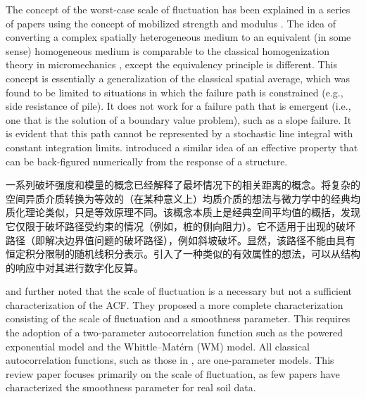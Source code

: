 \begin{ParaColumn}
    \CrossColumnText{
        
    }

    \switchcolumn*

    The concept of the worst-case scale of fluctuation has been explained in a series of papers using the concept of mobilized strength and modulus \citep{Ching2013a,Ching2013b,Ching2014686,Hu2015121,Ching2016a,Ching2016b,Ching2016e,Ching2017b,Ching2017c}. The idea of converting a complex spatially heterogeneous medium to an equivalent (in some sense) homogeneous medium is comparable to the classical homogenization theory in micromechanics \citep{Paiboon20133233}, except the equivalency principle is different. This concept is essentially a generalization of the classical spatial average, which was found to be limited to situations in which the failure path is constrained (e.g., side resistance of pile). It does not work for a failure path that is emergent (i.e., one that is the solution of a boundary value problem), such as a slope failure. It is evident that this path cannot be represented by a stochastic line integral with constant integration limits. \citet{Hicks201236,Hicks2012215,Hicks2019313} introduced a similar idea of an effective property that can be back-figured numerically from the response of a structure.

    \switchcolumn

    一系列破坏强度和模量的概念已经解释了最坏情况下的相关距离的概念\citep{Ching2013a,Ching2013b,Ching2014686,Hu2015121,Ching2016a,Ching2016b,Ching2016e,Ching2017b,Ching2017c}。将复杂的空间异质介质转换为等效的（在某种意义上）均质介质的想法与微力学中的经典均质化理论\citep{Paiboon20133233}类似，只是等效原理不同。该概念本质上是经典空间平均值的概括，发现它仅限于破坏路径受约束的情况（例如，桩的侧向阻力）。它不适用于出现的破坏路径（即解决边界值问题的破坏路径），例如斜坡破坏。显然，该路径不能由具有恒定积分限制的随机线积分表示。\citet{Hicks201236,Hicks2012215,Hicks2019313}引入了一种类似的有效属性的想法，可以从结构的响应中对其进行数字化反算。

    \switchcolumn*

    \citet{Ching2018}and \citet{Ching201981} further noted that the scale of fluctuation is a necessary but not a sufficient characterization of the ACF. They proposed a more complete characterization consisting of the scale of fluctuation and a smoothness parameter. This requires the adoption of a two-parameter autocorrelation function such as the powered exponential model and the Whittle–Matérn (WM) model. All classical autocorrelation functions, such as those in , are one-parameter models. This review paper focuses primarily on the scale of fluctuation, as few papers have characterized the smoothness parameter for real soil data.


\end{ParaColumn}
